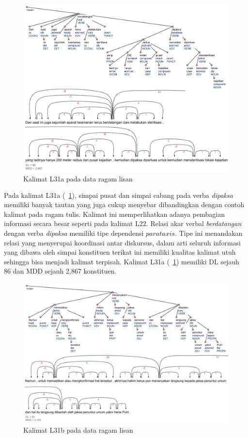\begin{figure}
	\centering \includegraphics[width=1
	\textwidth] {pics/ls1716.jpg} 
	\caption{Kalimat L31a pada data ragam lisan} 
	\label{fig:ls1716} 
\end{figure}

Pada kalimat L31a (\pic~\ref{fig:ls1716}), simpai pusat dan simpai cabang pada verba \textit{dipaksa} memiliki banyak tautan yang juga cukup menyebar dibandingkan dengan contoh kalimat pada ragam tulis. Kalimat ini memperlihatkan adanya pembagian informasi secara besar seperti pada kalimat L22. Relasi akar verbal \textit{berdatangan} dengan verba \textit{dipaksa} memiliki tipe dependensi $parataxis$. Tipe ini menandakan relasi yang menyerupai koordinasi antar diskursus, dalam arti seluruh informasi yang dibawa oleh simpai konstituen terikat ini memiliki kualitas kalimat utuh sehingga bisa menjadi kalimat terpisah. Kalimat L31a (\pic~\ref{fig:ls1716}) memiliki DL sejauh 86 dan MDD sejauh 2,867 konstituen. 

\begin{figure}
	\centering \includegraphics[width=1
	\textwidth] {pics/ls16.jpg} 
	\caption{Kalimat L31b pada data ragam lisan}
	\label{fig:ls16} 
\end{figure}

